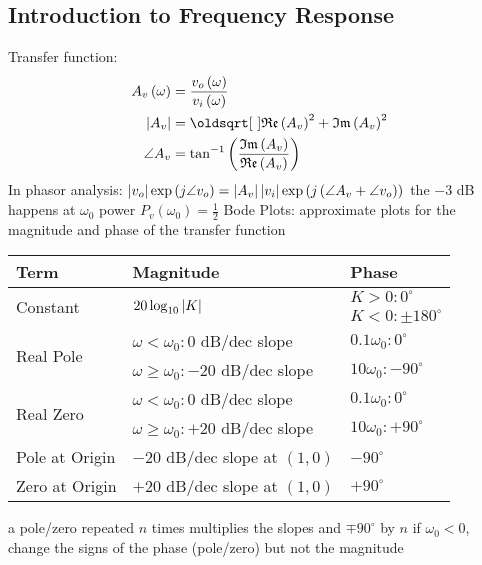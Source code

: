 \documentclass[a4paper,11pt]{article}
\begin{document}
	\subsection{Introduction to Frequency Response}
	\begin{outline}[enumerate]
		\1 Transfer function: 
			\begin{align*}
				A_{v} \left( \omega \right) &= \frac{v_{o} \left( \omega \right)}{v_{i} \left( \omega \right)} \\
				\absolute{A_{v}} &= \sqrt{\mathfrak{Re} \left( A_{v} \right)^2 + \mathfrak{Im} \left( A_{v} \right)^2} \\
				\angle A_{v} &= \atan \left( \frac{\mathfrak{Im} \left( A_{v} \right)}{\mathfrak{Re} \left( A_{v} \right)} \right)
			\end{align*}
		\1 In phasor analysis: $\left \lvert v_{o} \right \rvert \exp \left( j \angle v_{o} \right) = \left \lvert A_{v} \right \rvert \left \lvert v_{i} \right \rvert \exp \left( j \left( \angle A_{v} + \angle v_{o} \right) \right)$	
			\2 the $-3$ dB happens at $\omega_{0}$
			\2 power $P_{v} \left( \omega_{0} \right) = \frac{1}{2}$ 
		\1 Bode Plots: approximate plots for the magnitude and phase of the transfer function 
		
		\begin{center}
		\begin{tabular}{|l|l|l|}
			\hline
			Term & Magnitude & Phase \\ \hline 
			\multirow{2}{*}{Constant} & \multirow{2}{*}{$20\log_{10} \left \lvert K \right \rvert$} & $K > 0 : 0^{\circ}$ \\ 
			& & $K < 0: \pm 180^{\circ}$ \\ \hline 
			\multirow{2}{*}{Real Pole} & $\omega < \omega_{0}: 0$ dB/dec slope & $0.1\omega_{0} : 0^{\circ}$  \\ 
			& $\omega \geq \omega_{0} : -20$ dB/dec slope & $10\omega_{0} : -90^{\circ}$ \\ \hline
			\multirow{2}{*}{Real Zero} & $\omega < \omega_{0}: 0$ dB/dec slope & $0.1\omega_{0} : 0^{\circ}$  \\ 
			& $\omega \geq \omega_{0} : +20$ dB/dec slope & $10\omega_{0} : +90^{\circ}$ \\ \hline
			Pole at Origin & $-20$ dB/dec slope at $(1, 0)$ & $-90^{\circ}$ \\ \hline
			Zero at Origin & $+20$ dB/dec slope at $(1, 0)$ & $+90^{\circ}$ \\ \hline
		\end{tabular}
		\end{center}	
			\2 a pole/zero repeated $n$ times multiplies the slopes and $\mp 90^{\circ}$ by $n$
			\2 if $\omega_{0} < 0$, change the signs of the phase (pole/zero) but not the magnitude
	\end{outline}
\end{document}
